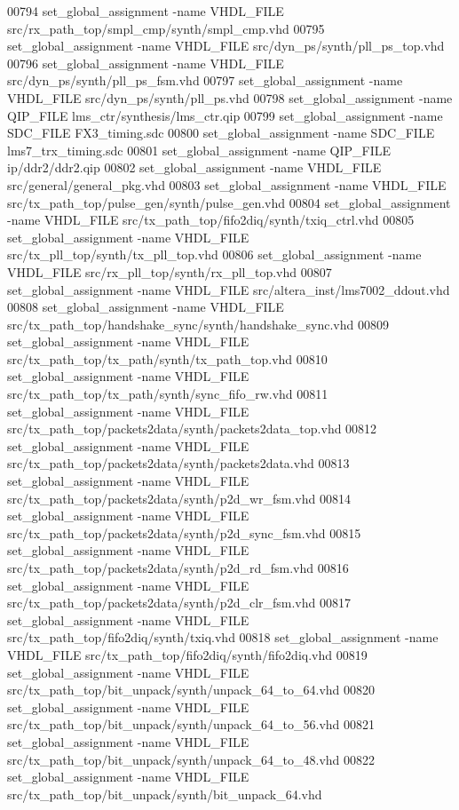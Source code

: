 \begin{DoxyCode}
00794 set\_global\_assignment -name VHDL\_FILE src/rx\_path\_top/smpl\_cmp/synth/smpl\_cmp.vhd
00795 set\_global\_assignment -name VHDL\_FILE src/dyn\_ps/synth/pll\_ps\_top.vhd
00796 set\_global\_assignment -name VHDL\_FILE src/dyn\_ps/synth/pll\_ps\_fsm.vhd
00797 set\_global\_assignment -name VHDL\_FILE src/dyn\_ps/synth/pll\_ps.vhd
00798 set\_global\_assignment -name QIP\_FILE lms\_ctr/synthesis/lms\_ctr.qip
00799 set\_global\_assignment -name SDC\_FILE FX3\_timing.sdc
00800 set\_global\_assignment -name SDC\_FILE lms7\_trx\_timing.sdc
00801 set\_global\_assignment -name QIP\_FILE ip/ddr2/ddr2.qip
00802 set\_global\_assignment -name VHDL\_FILE src/general/general\_pkg.vhd
00803 set\_global\_assignment -name VHDL\_FILE src/tx\_path\_top/pulse\_gen/synth/pulse\_gen.vhd
00804 set\_global\_assignment -name VHDL\_FILE src/tx\_path\_top/fifo2diq/synth/txiq\_ctrl.vhd
00805 set\_global\_assignment -name VHDL\_FILE src/tx\_pll\_top/synth/tx\_pll\_top.vhd
00806 set\_global\_assignment -name VHDL\_FILE src/rx\_pll\_top/synth/rx\_pll\_top.vhd
00807 set\_global\_assignment -name VHDL\_FILE src/altera\_inst/lms7002\_ddout.vhd
00808 set\_global\_assignment -name VHDL\_FILE src/tx\_path\_top/handshake\_sync/synth/handshake\_sync.vhd
00809 set\_global\_assignment -name VHDL\_FILE src/tx\_path\_top/tx\_path/synth/tx\_path\_top.vhd
00810 set\_global\_assignment -name VHDL\_FILE src/tx\_path\_top/tx\_path/synth/sync\_fifo\_rw.vhd
00811 set\_global\_assignment -name VHDL\_FILE src/tx\_path\_top/packets2data/synth/packets2data\_top.vhd
00812 set\_global\_assignment -name VHDL\_FILE src/tx\_path\_top/packets2data/synth/packets2data.vhd
00813 set\_global\_assignment -name VHDL\_FILE src/tx\_path\_top/packets2data/synth/p2d\_wr\_fsm.vhd
00814 set\_global\_assignment -name VHDL\_FILE src/tx\_path\_top/packets2data/synth/p2d\_sync\_fsm.vhd
00815 set\_global\_assignment -name VHDL\_FILE src/tx\_path\_top/packets2data/synth/p2d\_rd\_fsm.vhd
00816 set\_global\_assignment -name VHDL\_FILE src/tx\_path\_top/packets2data/synth/p2d\_clr\_fsm.vhd
00817 set\_global\_assignment -name VHDL\_FILE src/tx\_path\_top/fifo2diq/synth/txiq.vhd
00818 set\_global\_assignment -name VHDL\_FILE src/tx\_path\_top/fifo2diq/synth/fifo2diq.vhd
00819 set\_global\_assignment -name VHDL\_FILE src/tx\_path\_top/bit\_unpack/synth/unpack\_64\_to\_64.vhd
00820 set\_global\_assignment -name VHDL\_FILE src/tx\_path\_top/bit\_unpack/synth/unpack\_64\_to\_56.vhd
00821 set\_global\_assignment -name VHDL\_FILE src/tx\_path\_top/bit\_unpack/synth/unpack\_64\_to\_48.vhd
00822 set\_global\_assignment -name VHDL\_FILE src/tx\_path\_top/bit\_unpack/synth/bit\_unpack\_64.vhd

\end{DoxyCode}
